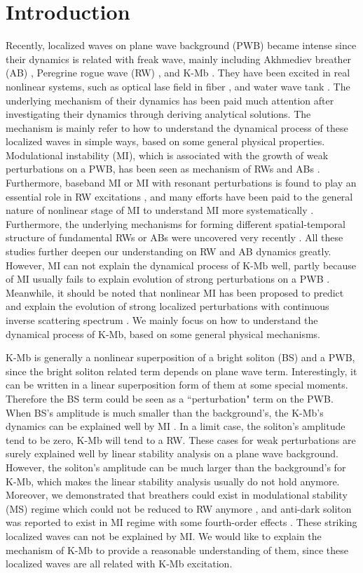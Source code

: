 \documentclass[aps,twocolumn,showpacs]{revtex4}
\begin{document}
\section{Introduction}
Recently, localized waves on plane wave background (PWB) became intense since their dynamics is related with freak wave, mainly including  Akhmediev breather (AB) \cite{AB}, Peregrine rogue wave (RW) \cite{RW},  and K-Mb \cite{K-M}. They have been excited in real nonlinear systems, such as optical lase field in fiber \cite{Kibler,Dudley,Kibler2}, and  water wave tank \cite{Chabchoub}. The underlying mechanism of their dynamics has been paid much attention after investigating their dynamics through deriving analytical solutions. The mechanism  is mainly refer to how to understand the dynamical process of  these localized waves in simple ways, based on some general physical properties. Modulational instability (MI), which is  associated with the growth of weak perturbations on a PWB, has been seen as mechanism of RWs and ABs \cite{Dudley}. Furthermore, baseband MI or MI with
resonant perturbations is found to play an essential role in RW excitations
\cite{Baronio1,Baronio3,zhaoling}, and many efforts have been paid to  the general nature of nonlinear stage of MI to understand MI more systematically
\cite{NMI,Zakharov}.  Furthermore, the underlying mechanisms for forming different spatial-temporal structure of fundamental RWs or ABs  were uncovered very recently \cite{Lingzhao}. All these studies further deepen our understanding on RW and AB dynamics greatly. However,  MI can not explain the dynamical process of   K-Mb well, partly because of MI usually fails to explain evolution of strong perturbations on a PWB \cite{biondini2}. Meanwhile, it should be noted that nonlinear MI has been proposed to predict and explain the evolution of strong localized perturbations with continuous inverse scattering spectrum  \cite{NMI,biondini3}. We mainly focus on how to understand the dynamical process of K-Mb, based on some general physical mechanisms.

K-Mb is generally  a nonlinear superposition of a bright soliton (BS) and a PWB, since the bright soliton related term  depends on plane wave term. Interestingly, it can be  written in a linear superposition form of them at some special moments. Therefore the BS term could be seen as a ``perturbation" term on the PWB. When BS's amplitude is much smaller than the background's, the K-Mb's dynamics can be explained well by MI  \cite{zhaoling}. In a limit case, the soliton's amplitude
tend to be zero, K-Mb will tend to a RW. These cases for weak perturbations are surely explained well by linear stability analysis on a plane wave background. However, the soliton's amplitude can be much larger than the background's for K-Mb, which makes the linear stability analysis usually do not hold anymore.  Moreover, we demonstrated that breathers could exist in modulational stability (MS) regime which could not be reduced to RW anymore \cite{defnls}, and anti-dark soliton was reported to exist in MI regime with some fourth-order effects \cite{AD}. These striking localized waves can not be explained by MI. We would like to explain the mechanism of K-Mb to provide a reasonable understanding of them, since these localized waves are all related with K-Mb excitation.
\end{document}
